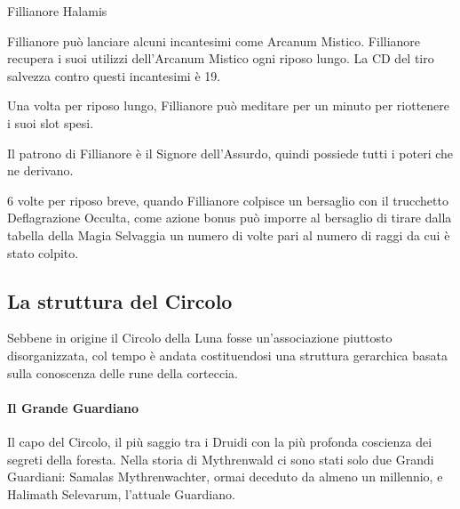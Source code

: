 \begin{DndMonster}[float*=b,width=\textwidth + 8pt]{Fillianore Halamis}
\begin{multicols}{2}
    Fillianore può lanciare alcuni incantesimi come Arcanum Mistico. Fillianore recupera i suoi utilizzi dell'Arcanum Mistico ogni riposo lungo. La CD del tiro salvezza contro questi incantesimi è 19.
    \begin{DndMonsterSpells}
    \end{DndMonsterSpells}

    Una volta per riposo lungo, Fillianore può meditare per un minuto per riottenere i suoi slot spesi.

    Il patrono di Fillianore è il Signore dell'Assurdo, quindi possiede tutti i poteri che ne derivano.

    6 volte per riposo breve, quando Fillianore colpisce un bersaglio con il trucchetto Deflagrazione Occulta, come azione bonus può imporre al bersaglio di tirare dalla tabella della Magia Selvaggia un numero di volte pari al numero di raggi da cui è stato colpito.

  \end{multicols}
\end{DndMonster}

\subsection{La struttura del Circolo}

Sebbene in origine il Circolo della Luna fosse un'associazione piuttosto disorganizzata, col tempo è andata costituendosi una struttura gerarchica basata sulla conoscenza delle rune della corteccia.

\paragraph{Il Grande Guardiano} Il capo del Circolo, il più saggio tra i Druidi con la più profonda coscienza dei segreti della foresta. Nella storia di Mythrenwald ci sono stati solo due Grandi Guardiani: Samalas Mythrenwachter, ormai deceduto da almeno un millennio, e Halimath Selevarum, l'attuale Guardiano.

